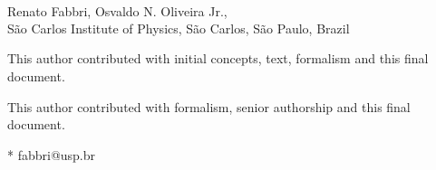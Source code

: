 \documentclass[10pt,letterpaper]{article}
\date{}
\begin{document}
\vspace*{0.2in}

\begin{flushleft}
{\Large
\textbf{} %
}
\newline
\\
Renato Fabbri\textsuperscript{\Yinyang*},
Osvaldo N. Oliveira Jr.\textsuperscript{\ddag},
\\
\bigskip
São Carlos Institute of Physics, São Carlos, São Paulo, Brazil
\bigskip

% 
%
\Yinyang This author contributed with initial concepts, text, formalism and this final document.

\ddag This author contributed with formalism, senior authorship and this final document.




* fabbri@usp.br

\end{flushleft}
\end{document}
